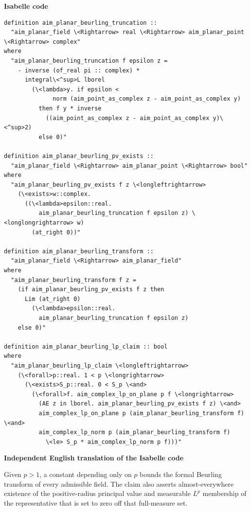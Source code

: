 \documentclass[10pt,oneside]{article}
\newcommand{\reviewlabel}[1]{\par\smallskip\noindent\textsf{\bfseries #1}\par\smallskip}
\begin{document}
\reviewlabel{Isabelle code}
\begin{lstlisting}
definition aim_planar_beurling_truncation ::
  "aim_planar_field \<Rightarrow> real \<Rightarrow> aim_planar_point \<Rightarrow> complex"
where
  "aim_planar_beurling_truncation f epsilon z =
    - inverse (of_real pi :: complex) *
      integral\<^sup>L lborel
        (\<lambda>y. if epsilon <
              norm (aim_point_as_complex z - aim_point_as_complex y)
          then f y * inverse
            ((aim_point_as_complex z - aim_point_as_complex y)\<^sup>2)
          else 0)"

definition aim_planar_beurling_pv_exists ::
  "aim_planar_field \<Rightarrow> aim_planar_point \<Rightarrow> bool"
where
  "aim_planar_beurling_pv_exists f z \<longleftrightarrow>
    (\<exists>w::complex.
      ((\<lambda>epsilon::real.
          aim_planar_beurling_truncation f epsilon z) \<longlongrightarrow> w)
        (at_right 0))"

definition aim_planar_beurling_transform ::
  "aim_planar_field \<Rightarrow> aim_planar_field"
where
  "aim_planar_beurling_transform f z =
    (if aim_planar_beurling_pv_exists f z then
      Lim (at_right 0)
        (\<lambda>epsilon::real.
          aim_planar_beurling_truncation f epsilon z)
    else 0)"

definition aim_planar_beurling_lp_claim :: bool
where
  "aim_planar_beurling_lp_claim \<longleftrightarrow>
    (\<forall>p::real. 1 < p \<longrightarrow>
      (\<exists>S_p::real. 0 < S_p \<and>
        (\<forall>f. aim_complex_lp_on_plane p f \<longrightarrow>
          (AE z in lborel. aim_planar_beurling_pv_exists f z) \<and>
          aim_complex_lp_on_plane p (aim_planar_beurling_transform f) \<and>
          aim_complex_lp_norm p (aim_planar_beurling_transform f)
            \<le> S_p * aim_complex_lp_norm p f)))"
\end{lstlisting}

\reviewlabel{Independent English translation of the Isabelle code}
Given $p>1$, a constant depending only on $p$ bounds the formal Beurling transform of every admissible field. The claim also asserts almost-everywhere existence of the positive-radius principal value and measurable $L^p$ membership of the representative that is set to zero off that full-measure set.
\end{document}

